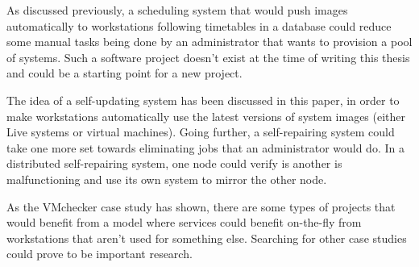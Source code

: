 As discussed previously, a scheduling system that would push images
automatically to workstations following timetables in a database could
reduce some manual tasks being done by an administrator that wants to
provision a pool of systems. Such a software project doesn't exist at
the time of writing this thesis and could be a starting point for a new
project.

The idea of a self-updating system has been discussed in this paper, in
order to make workstations automatically use the latest versions of
system images (either Live systems or virtual machines). Going further,
a self-repairing system could take one more set towards eliminating jobs
that an administrator would do. In a distributed self-repairing system,
one node could verify is another is malfunctioning and use its own
system to mirror the other node.

As the VMchecker case study has shown, there are some types of projects
that would benefit from a model where services could benefit on-the-fly
from workstations that aren't used for something else. Searching for
other case studies could prove to be important research.

